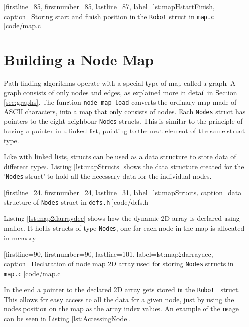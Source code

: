 {
[firstline=85,			%
firstnumber=85,		%
lastline=87,			%
label=lst:mapHstartFinish,	%
caption={Storing start and finish position in the {\tt Robot} struct in {\tt map.c}}
]{code/map.c}

\newpage

\section{Building a Node Map}
\label{sec:map_node} %
Path finding algorithms operate with a special type of map called a graph.
A graph consists of only nodes and edges, as explained more in detail in Section \ref{sec:graphs}.
The function {\tt node\_map\_load} converts the ordinary map made of ASCII characters, into a map that only consists of nodes.
Each {\tt Nodes} struct has pointers to the eight neighbour {\tt Nodes} structs.
This is similar to the principle of having a pointer in a linked list, pointing to the next element of the same struct type.

Like with linked lists, structs can be used as a data structure to store data of different types. 
Listing \ref{lst:mapStructs} shows the data structure created for the '{\tt Nodes} struct' to hold all the necessary data for the individual nodes.


[firstline=24,			%
firstnumber=24,		%
lastline=31,			%
label=lst:mapStructs,	%
caption={data structure of {\tt Nodes} struct in {\tt defs.h}}
]{code/defs.h}

Listing \ref{lst:map2darraydec} shows how the dynamic 2D array is declared using malloc. 
It holds structs of type {\tt Nodes}, one for each node in the map is allocated in memory.


[firstline=90,			%
firstnumber=90,		%
lastline=101,			%
label=lst:map2darraydec,	%
caption={Declaration of node map 2D array used for storing {\tt Nodes} structs in {\tt map.c}}
]{code/map.c}

In the end a pointer to the declared 2D array gets stored in the {\tt Robot } struct.
This allows for easy access to all the data for a given node, just by using the nodes position on the map as the array index values. An example of the usage can be seen in Listing \ref{lst:AccessingNode}. 

}

